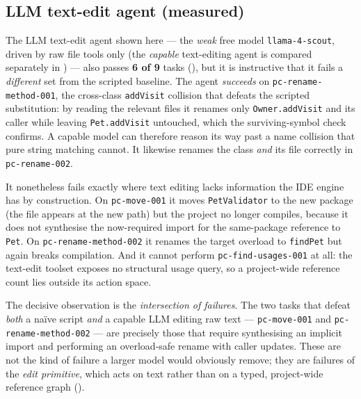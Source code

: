 \subsection{LLM text-edit agent (measured)}
The LLM text-edit agent shown here --- the \emph{weak} free model
\texttt{llama-4-scout}, driven by raw file tools only (the \emph{capable} text-editing
agent is compared separately in ) --- also passes
\textbf{6 of 9} tasks (), but it is instructive
that it fails a \emph{different} set from the scripted baseline. The agent
\emph{succeeds} on \texttt{pc-rename-method-001}, the cross-class \texttt{addVisit}
collision that defeats the scripted substitution: by reading the relevant files it
renames only \texttt{Owner.addVisit} and its caller while leaving
\texttt{Pet.addVisit} untouched, which the surviving-symbol check confirms. A
capable model can therefore reason its way past a name collision that pure string
matching cannot. It likewise renames the class \emph{and} its file correctly in
\texttt{pc-rename-002}.

It nonetheless fails exactly where text editing lacks information the IDE engine
has by construction. On \texttt{pc-move-001} it moves \texttt{PetValidator} to the
new package (the file appears at the new path) but the project no longer compiles,
because it does not synthesise the now-required import for the same-package
reference to \texttt{Pet}. On \texttt{pc-rename-method-002} it renames the target
overload to \texttt{findPet} but again breaks compilation. And it cannot perform
\texttt{pc-find-usages-001} at all: the text-edit toolset exposes no structural
usage query, so a project-wide reference count lies outside its action space.

The decisive observation is the \emph{intersection of failures}. The two tasks
that defeat \emph{both} a na\"ive script \emph{and} a capable LLM editing raw text
--- \texttt{pc-move-001} and \texttt{pc-rename-method-002} --- are precisely those
that require synthesising an implicit import and performing an overload-safe rename
with caller updates. These are not the kind of failure a larger model would
obviously remove; they are failures of the \emph{edit primitive}, which acts on
text rather than on a typed, project-wide reference graph
().

